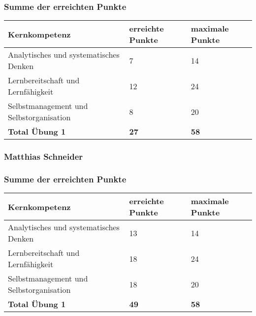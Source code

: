 \subsubsection{Summe der erreichten Punkte}
\begin{center}
  \begin{tabular}{ | p{7cm} | p{3cm} | p{3cm} |}
   \hline
   \textbf{Kernkompetenz} & \textbf{erreichte Punkte} & \textbf{maximale Punkte} \\ \hline
   Analytisches und systematisches Denken & 7 & 14\\ \hline
  Lernbereitschaft und Lernfähigkeit & 12 & 24\\ \hline
   Selbstmanagement und Selbstorganisation & 8 & 20\\ \hline
   \textbf{Total Übung 1} & \textbf{27} & \textbf{58}\\ \hline
  \end{tabular}
\end{center}

\subsubsection{Matthias Schneider}

\subsubsection{Summe der erreichten Punkte}
\begin{center}
  \begin{tabular}{ | p{7cm} | p{3cm} | p{3cm} |}
   \hline
   \textbf{Kernkompetenz} & \textbf{erreichte Punkte} & \textbf{maximale Punkte} \\ \hline
   Analytisches und systematisches Denken & 13 & 14\\ \hline
  Lernbereitschaft und Lernfähigkeit & 18 & 24\\ \hline
   Selbstmanagement und Selbstorganisation & 18 & 20\\ \hline
   \textbf{Total Übung 1} & \textbf{49} & \textbf{58}\\ \hline
  \end{tabular}
\end{center}

